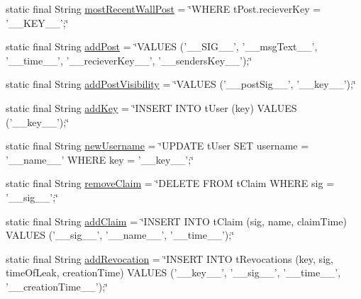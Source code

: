 \begin{DoxyCompactItemize}
\item 
static final String \hyperlink{classballmerpeak_1_1turtlenet_1_1server_1_1DBStrings_ad9c0536856622b589ca1c0877681c86c}{most\-Recent\-Wall\-Post} = \char`\"{}W\-H\-E\-R\-E t\-Post.\-reciever\-Key = '\-\_\-\-\_\-\-K\-E\-Y\-\_\-\-\_\-';\char`\"{}
\item 
static final String \hyperlink{classballmerpeak_1_1turtlenet_1_1server_1_1DBStrings_a0fa383a5ec1519c387372722ee41a7fe}{add\-Post} = \char`\"{}V\-A\-L\-U\-E\-S ('\-\_\-\-\_\-\-S\-I\-G\-\_\-\-\_\-', '\-\_\-\-\_\-msg\-Text\-\_\-\-\_\-', '\-\_\-\-\_\-time\-\_\-\-\_\-', '\-\_\-\-\_\-reciever\-Key\-\_\-\-\_\-', '\-\_\-\-\_\-senders\-Key\-\_\-\-\_\-');\char`\"{}
\item 
static final String \hyperlink{classballmerpeak_1_1turtlenet_1_1server_1_1DBStrings_a3a96505a04038ec4631bbeeb7aa64f4d}{add\-Post\-Visibility} = \char`\"{}V\-A\-L\-U\-E\-S ('\-\_\-\-\_\-post\-Sig\-\_\-\-\_\-', '\-\_\-\-\_\-key\-\_\-\-\_\-');\char`\"{}
\item 
static final String \hyperlink{classballmerpeak_1_1turtlenet_1_1server_1_1DBStrings_a411c712ba8bd368765dfd890abca6106}{add\-Key} = \char`\"{}I\-N\-S\-E\-R\-T I\-N\-T\-O t\-User (key) V\-A\-L\-U\-E\-S ('\-\_\-\-\_\-key\-\_\-\-\_\-');\char`\"{}
\item 
static final String \hyperlink{classballmerpeak_1_1turtlenet_1_1server_1_1DBStrings_a9561d2bc731daafe8e20cb46dc51cfb6}{new\-Username} = \char`\"{}U\-P\-D\-A\-T\-E t\-User S\-E\-T username = '\-\_\-\-\_\-name\-\_\-\-\_\-' W\-H\-E\-R\-E key = '\-\_\-\-\_\-key\-\_\-\-\_\-';\char`\"{}
\item 
static final String \hyperlink{classballmerpeak_1_1turtlenet_1_1server_1_1DBStrings_a01691bb9e0418b279a1eb0bcddb94b14}{remove\-Claim} = \char`\"{}D\-E\-L\-E\-T\-E F\-R\-O\-M t\-Claim W\-H\-E\-R\-E sig = '\-\_\-\-\_\-sig\-\_\-\-\_\-';\char`\"{}
\item 
static final String \hyperlink{classballmerpeak_1_1turtlenet_1_1server_1_1DBStrings_a7622f836df4c75f736ae6b35eaa936a9}{add\-Claim} = \char`\"{}I\-N\-S\-E\-R\-T I\-N\-T\-O t\-Claim (sig, name, claim\-Time) V\-A\-L\-U\-E\-S ('\-\_\-\-\_\-sig\-\_\-\-\_\-', '\-\_\-\-\_\-name\-\_\-\-\_\-', '\-\_\-\-\_\-time\-\_\-\-\_\-');\char`\"{}
\item 
static final String \hyperlink{classballmerpeak_1_1turtlenet_1_1server_1_1DBStrings_a75d68f5b33bdd9fa483ebe6c4145b17e}{add\-Revocation} = \char`\"{}I\-N\-S\-E\-R\-T I\-N\-T\-O t\-Revocations (key, sig, time\-Of\-Leak, creation\-Time) V\-A\-L\-U\-E\-S ('\-\_\-\-\_\-key\-\_\-\-\_\-', '\-\_\-\-\_\-sig\-\_\-\-\_\-', '\-\_\-\-\_\-time\-\_\-\-\_\-', '\-\_\-\-\_\-creation\-Time\-\_\-\-\_\-');\char`\"{}

\end{DoxyCompactItemize}
